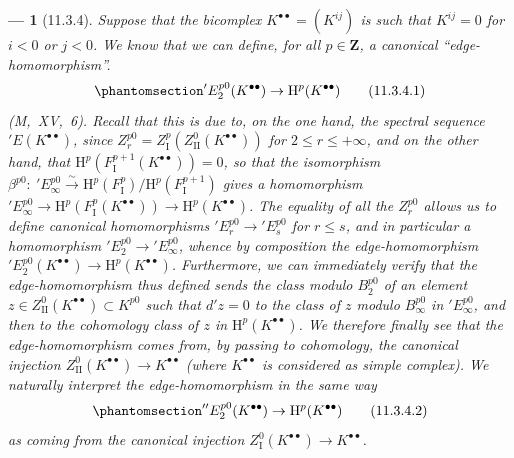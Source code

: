\documentclass[oneside]{amsart}
\theoremstyle{ega-env-style}
\newtheorem*{env}{---}
\theoremstyle{ega-thm-env-style}
\theoremstyle{ega-defn-env-style}
\def\bb{\mathbf}                    %
\def\leq{\leqslant}                 %
\def\HH{\mathrm{H}}                 %
\def\simto{\xrightarrow{\sim}}
\let\EGAOriginalLabel\label
\renewcommand{\label}[1]{\phantomsection\EGAOriginalLabel{#1}}
\begin{document}
\begin{env}[11.3.4]
\label{0.11.3.4}
Suppose that the bicomplex $K^{\bullet\bullet}=(K^{ij})$ is such that $K^{ij}=0$ for $i<0$ or $j<0$.
We know that we can define, for all $p\in\bb{Z}$, a canonical ``edge-homomorphism''.
\[
\label{0.11.3.4.1}
  'E_2^{p0}(K^{\bullet\bullet})
  \rightarrow \HH^{p}(K^{\bullet\bullet})
\tag{11.3.4.1}
\]
(M,~XV,~6).
Recall that this is due to, on the one hand, the spectral sequence
$'E(K^{\bullet\bullet})$, since $Z_r^{p0}=Z_{\mathrm{I}}^{p}(Z_{\mathrm{II}}^{0}(K^{\bullet\bullet}))$ for $2\leq r \leq +\infty$, and on the other hand, that $\HH^{p}(F_\mathrm{I}^{p+1}(K^{\bullet\bullet})) = 0$, so that the isomorphism $\beta^{p0}:\ 'E_\infty^{p0} \simto \HH^{p}(F_\mathrm{I}^p)/\HH^{p}(F_\mathrm{I}^{p+1})$ gives a homomorphism $'E_\infty^{p0} \rightarrow \HH^{p}(F_\mathrm{I}^p(K^{\bullet\bullet})) \rightarrow \HH^{p}(K^{\bullet\bullet})$.
The equality of all the $Z_r^{p0}$ allows us to define canonical homomorphisms $'E_r^{p0} \rightarrow 'E_s^{p0}$ for $r \leq s$, and in particular a homomorphism $'E_2^{p0} \rightarrow 'E_\infty^{p0}$, whence by composition the edge-homomorphism $'E_2^{p0}(K^{\bullet\bullet}) \rightarrow \HH^{p}(K^{\bullet\bullet})$.
Furthermore, we can immediately verify that the edge-homomorphism thus defined sends the class modulo $B_2^{p0}$ of an element $z\in Z_\mathrm{II}^0(K^{\bullet\bullet})\subset K^{p0}$ such that $d'z=0$ to the class of $z$ modulo $B_\infty^{p0}$ in $'E_\infty^{p0}$, and then to the cohomology class of $z$ in $\HH^p(K^{\bullet\bullet})$.
We therefore finally see that the \emph{edge-homomorphism}  \emph{comes from, by passing to cohomology, the canonical injection} $Z_\mathrm{II}^0(K^{\bullet\bullet}) \rightarrow K^{\bullet\bullet}$  (where $K^{\bullet\bullet}$ is considered as simple complex).
We naturally interpret the edge-homomorphism in the same way 
\[
\label{0.11.3.4.2}
  ''E_2^{p0}(K^{\bullet\bullet})
  \rightarrow \HH^{p}(K^{\bullet\bullet})
\tag{11.3.4.2}
\]
as coming from the canonical injection $Z_\mathrm{I}^0(K^{\bullet\bullet}) \rightarrow K^{\bullet\bullet}$.
\end{env}
\end{document}
